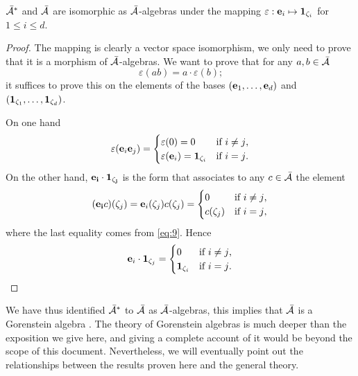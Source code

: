 \begin{proposition}
  $\bar{\mathcal{A}}^\ast$ and $\bar{\mathcal{A}}$ are isomorphic as
  $\bar{\mathcal{A}}$-algebras under the mapping
  $\varepsilon:\mathbf{e}_i\mapsto\mathbf{1}_{\zeta_i}$ for $1\le i\le d$.
\end{proposition}
\begin{proof}
  The mapping is clearly a vector space isomorphism, we only need to
  prove that it is a morphism of $\bar{\mathcal{A}}$-algebras. We want
  to prove that for any $a,b\in\bar{\mathcal{A}}$
  \[\varepsilon(ab) = a\cdot\varepsilon(b)\text{;}\]
  it suffices to prove this on the elements of the bases
  $(\mathbf{e}_1,\ldots,\mathbf{e}_d)$ and
  $(\mathbf{1}_{\zeta_1},\ldots,\mathbf{1}_{\zeta_d})$.

  On one hand
  \begin{equation}
    \label{eq:12}
    \varepsilon(\mathbf{e}_i\mathbf{e}_j)=
    \begin{cases}
      \varepsilon(0)=0 &\text{if $i\ne j$,}\\
      \varepsilon(\mathbf{e}_i)=\mathbf{1}_{\zeta_i} &\text{if $i=j$.}
    \end{cases}
  \end{equation}
  On the other hand, $\mathbf{e_i}\cdot\mathbf{1_{\zeta_j}}$ is the form
  that associates to any $c\in\bar{\mathcal{A}}$ the element
  \begin{equation}
    \label{eq:13}
    (\mathbf{e_i}c)(\zeta_j) = \mathbf{e}_i(\zeta_j)c(\zeta_j) = 
    \begin{cases}
      0 &\text{if $i\ne j$,}\\
      c(\zeta_j) &\text{if $i=j$,}
    \end{cases}
  \end{equation}
  where the last equality comes from \eqref{eq:9}. Hence
  \begin{equation}
    \label{eq:14}
    \mathbf{e}_i\cdot\mathbf{1}_{\zeta_j}=
    \begin{cases}
      0 &\text{if $i\ne j$,}\\
      \mathbf{1}_{\zeta_i} &\text{if $i=j$.}
    \end{cases}
  \end{equation}
\end{proof}

\begin{note}
  We have thus identified $\bar{\mathcal{A}}^\ast$ to
  $\bar{\mathcal{A}}$ as $\bar{\mathcal{A}}$-algebras, this implies that
  $\bar{\mathcal{A}}$ is a Gorenstein algebra \cite[Chapter
  8]{mourrain+elkadi}. The theory of Gorenstein algebras is much
  deeper than the exposition we give here, and giving a complete
  account of it would be beyond the scope of this
  document. Nevertheless, we will eventually point out the
  relationships between the results proven here and the general
  theory.
\end{note}


